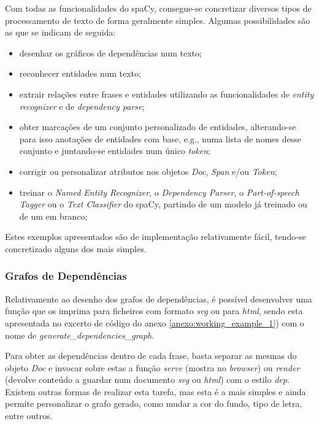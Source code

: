 \documentclass[12pt]{article}
\begin{document}
Com todas as funcionalidades do spaCy, consegue-se concretizar diversos tipos de processamento de texto de forma geralmente simples. Algumas possibilidades são as que se indicam de seguida:
\vspace*{-0.3cm}
\begin{itemize}\itemsep1pt
	\setlength{\itemindent}{+.5cm}	
	\item desenhar os gráficos de dependências num texto;
	\item reconhecer entidades num texto;
	\item extrair relações entre frases e entidades utilizando as funcionalidades de \textit{entity recognizer} e de \textit{dependency parse};
	\item obter marcações de um conjunto personalizado de entidades, alterando-se para isso anotações de entidades com base, e.g., numa lista de nomes desse conjunto e juntando-se entidades num único \textit{token};
	\item corrigir ou personalizar atributos nos objetos \textit{Doc}, \textit{Span} e/ou \textit{Token};
	\item treinar o \textit{Named Entity Recognizer}, o \textit{Dependency Parser}, o \textit{Part-of-speech Tagger} ou o \textit{Text Classifier} do spaCy, partindo de um modelo já treinado ou de um em branco;
\end{itemize}


Estes exemplos apresentados são de implementação relativamente fácil, tendo-se concretizado alguns dos mais simples.

\subsubsection{Grafos de Dependências}

Relativamente ao desenho dos grafos de dependências, é possível desenvolver uma função que os imprima para ficheiros com formato \textit{svg} ou para \textit{html}, sendo esta apresentada no excerto de código do anexo \ref{anexo:working_example_1}) com o nome de \textit{generate\_dependencies\_graph}.

Para obter as dependências dentro de cada frase, basta separar as mesmas do objeto \textit{Doc} e invocar sobre estas a função \textit{serve} (mostra no \textit{browser}) ou \textit{render} (devolve conteúdo a guardar num documento \textit{svg} ou \textit{html}) com o estilo \textit{dep}. Existem outras formas de realizar esta tarefa, mas esta é a mais simples e ainda permite personalizar o grafo gerado, como mudar a cor do fundo, tipo de letra, entre outros.
\end{document}
